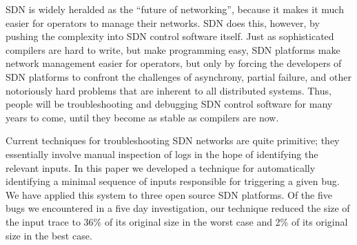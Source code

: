 SDN is widely heralded as the ``future of networking'', because it makes it
much easier for operators to manage their networks. SDN does this, however, by
pushing the complexity into SDN control software itself. Just as sophisticated
compilers are hard to write, but make programming easy, SDN platforms make
network management easier for operators, but only by forcing the developers of
SDN platforms to confront the challenges of asynchrony, partial failure, and
other notoriously hard problems that are inherent to all distributed systems.
Thus, people will be troubleshooting and debugging SDN control software for many
years to come, until they become as stable as compilers are now.

Current techniques for troubleshooting SDN networks are quite primitive; they
essentially involve manual inspection of logs in the hope of identifying the
relevant inputs. In this paper we developed a technique for automatically
identifying a minimal sequence of inputs responsible for triggering a given
bug. We have applied this system to three open source SDN platforms.
Of the five bugs we encountered in a five day investigation,
our technique reduced the size of the input trace to 36\% of its original size in
the worst case and 2\% of its original size in the best case.




